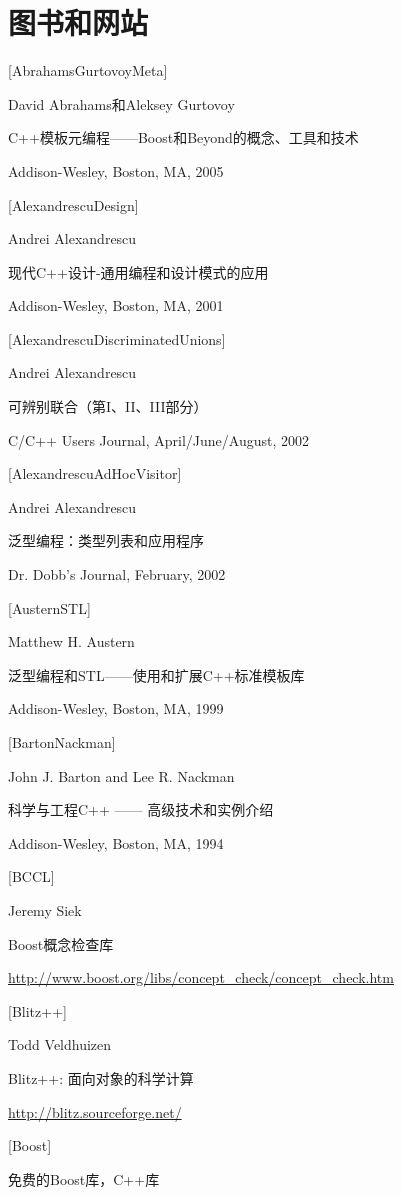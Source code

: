 \section*{图书和网站}

{[AbrahamsGurtovoyMeta]}

David Abrahams和Aleksey Gurtovoy

C++模板元编程——Boost和Beyond的概念、工具和技术
 
Addison-Wesley, Boston, MA, 2005

{[AlexandrescuDesign]}

Andrei Alexandrescu

现代C++设计-通用编程和设计模式的应用

Addison-Wesley, Boston, MA, 2001

{[AlexandrescuDiscriminatedUnions]}

Andrei Alexandrescu

可辨别联合（第I、II、III部分）

C/C++ Users Journal, April/June/August, 2002

{[AlexandrescuAdHocVisitor]}

Andrei Alexandrescu

泛型编程：类型列表和应用程序

Dr. Dobb's Journal, February, 2002

{[AusternSTL]}

Matthew H. Austern

泛型编程和STL——使用和扩展C++标准模板库

Addison-Wesley, Boston, MA, 1999

{[BartonNackman]}

John J. Barton and Lee R. Nackman

科学与工程C++ —— 高级技术和实例介绍

Addison-Wesley, Boston, MA, 1994

{[BCCL]}

Jeremy Siek

Boost概念检查库

\url{http://www.boost.org/libs/concept_check/concept_check.htm}

{[Blitz++]}

Todd Veldhuizen

Blitz++: 面向对象的科学计算

\url{http://blitz.sourceforge.net/}

{[Boost]}

免费的Boost库，C++库

